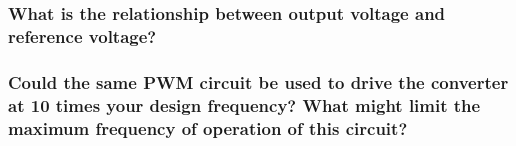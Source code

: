 \subsubsection{What is the relationship between output voltage and reference voltage?}
\subsubsection{Could the same PWM circuit be used to drive the converter at 10 times your design frequency? What might limit the maximum frequency of operation of this circuit?}

